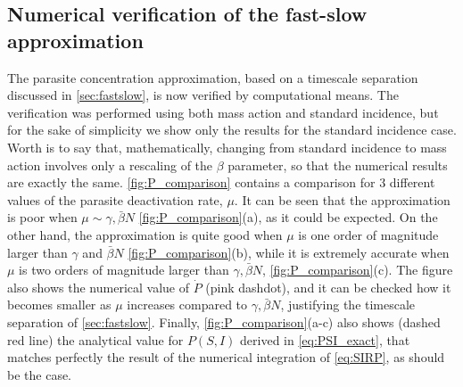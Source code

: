 \subsection{Numerical verification of the fast-slow approximation}

The parasite concentration approximation, based on a timescale separation
discussed in \cref{sec:fastslow}, is now verified by computational means. The
verification was performed using both mass action and standard incidence, but
for the sake of simplicity we show only the results for the standard incidence
case. Worth is to say that, mathematically, changing from standard incidence to
mass action involves only a rescaling of the $\beta$ parameter, so that the
numerical results are exactly the same. \cref{fig:P_comparison} contains a
comparison for $3$ different values of the parasite deactivation rate, $\mu$.
It can be seen that the approximation is poor when $\mu\sim
    \gamma,\bar{\beta}N$ \cref{fig:P_comparison}(a), as it could be expected.
On
the other hand, the approximation is quite good when $\mu$ is one order of
magnitude larger than $\gamma$ and $\bar{\beta}N$ \cref{fig:P_comparison}(b),
while it is extremely accurate when $\mu$ is two orders of magnitude larger
than $\gamma,\bar{\beta}N$, \cref{fig:P_comparison}(c). The figure also shows
the numerical value of $\dot{P}$ (pink dashdot), and it can be checked how it
becomes smaller as $\mu$ increases compared to $\gamma,\bar{\beta}N$,
justifying the timescale separation of \cref{sec:fastslow}. Finally,
\cref{fig:P_comparison}(a-c) also shows (dashed red line) the analytical value
for $P(S,I)$ derived in \cref{eq:PSI_exact}, that matches perfectly the result
of the numerical integration of \cref{eq:SIRP}, as should be the case.

